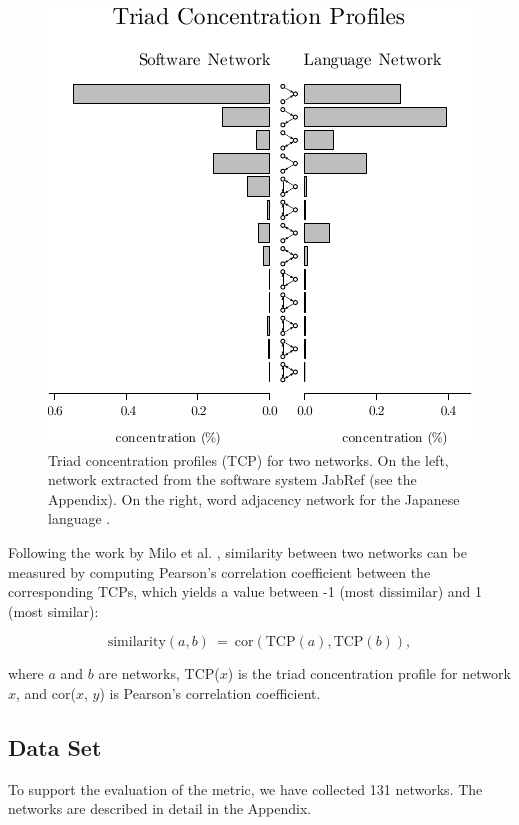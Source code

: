 \begin{figure}[!t]
\center
\includegraphics{tcp}
\caption{Triad concentration profiles (TCP) for two networks. On the left,
network extracted from the software system JabRef (see the Appendix). On the
right, word adjacency network for the Japanese language \cite{Milo2004}.}
\label{fig:profiles}
\end{figure}

Following the work by Milo et al. \cite{Milo2004}, similarity between two
networks can be measured by computing Pearson's correlation coefficient between
the corresponding TCPs, which yields a value between -1 (most dissimilar) and 1
(most similar):

$$
\mathrm{similarity}(a, b) ~=~ 
  \mathrm{cor}(\mathrm{TCP}(a), \mathrm{TCP}(b))\mathrm{,}
$$

where $a$ and $b$ are networks, TCP($x$) is the triad concentration profile for
network $x$, and cor($x$, $y$) is Pearson's correlation coefficient.

\subsection{Data Set}

To support the evaluation of the metric, we have collected 131 networks. The
networks are described in detail in the Appendix.

